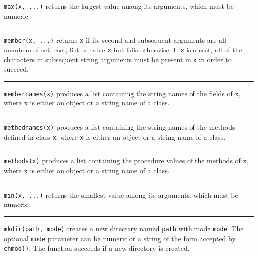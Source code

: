 \noindent
{}\texttt{max(x, ...)} returns the largest value among its
arguments, which must be numeric.

\bigskip\hrule\vspace{0.1cm}

\noindent
{}\texttt{member(x, ...)} returns \texttt{x} if its second
and subsequent arguments are all members of set, cset, list or table
\texttt{x} but fails otherwise. If \texttt{x} is a cset, all of the
characters in subsequent string arguments must be present in \texttt{x}
in order to succeed.

\bigskip\hrule\vspace{0.1cm}

\noindent
\texttt{membernames(x)} produces a list containing the string names of
the fields of x, where x is either an object or a string name of a
class.

\bigskip\hrule\vspace{0.1cm}

\noindent
\texttt{methodnames(x)} produces a list containing the string names of
the methods defined in class \texttt{x}, where \texttt{x} is either an
object or a string name of a class.

\bigskip\hrule\vspace{0.1cm}

\noindent
\texttt{methods(x)} produces a list containing the procedure values of
the methods of x, where x is either an object or a string name of a
class.

\bigskip\hrule\vspace{0.1cm}

\noindent
{}\texttt{min(x, ...)} returns the smallest value among its
arguments, which must be numeric.

\bigskip\hrule\vspace{0.1cm}

\noindent
{}
\texttt{mkdir(path,
mode)} creates a new directory named \texttt{path} with mode
\texttt{mode}. The optional \texttt{mode} parameter can be numeric or a
string of the form accepted by \texttt{chmod()}. The function succeeds
if a new directory is created.


